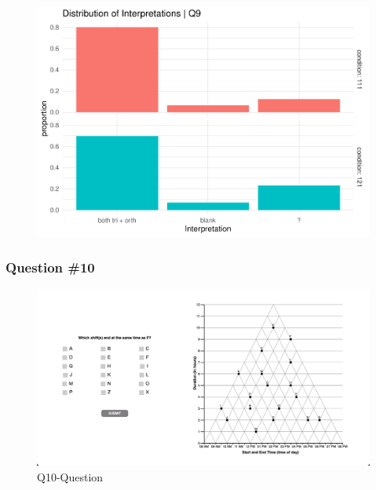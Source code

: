 \documentclass[
  letterpaper,
  DIV=11,
  numbers=noendperiod]{scrreprt}
\begin{document}
\begin{figure}[H]

{\centering \includegraphics{analysis/SGC3A/2_sgc3A_scoring_files/figure-pdf/Q9-distribution-2.pdf}

}

\end{figure}

\hypertarget{question-10}{%
\subsubsection{Question \#10}\label{question-10}}

\begin{figure}

{\centering \includegraphics{analysis/SGC3A/static/questions/Q10.png}

}

\caption{\label{fig-Q10}Q10-Question}

\end{figure}
\end{document}
